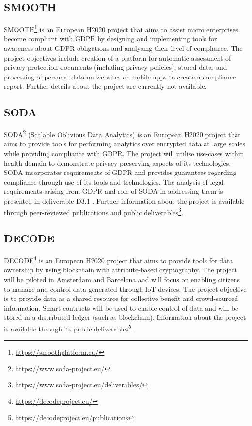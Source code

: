\subsection*{SMOOTH}
SMOOTH\footnote{\url{https://smoothplatform.eu/}} is an European H2020 project that aims to assist micro enterprises become compliant with GDPR by designing and implementing tools for awareness about GDPR obligations and analysing their level of compliance.
The project objectives include creation of a platform for automatic assessment of privacy protection documents (including privacy policies), stored data, and processing of personal data on websites or mobile apps to create a compliance report. Further details about the project are currently not available.

\subsection*{SODA}
SODA\footnote{\url{https://www.soda-project.eu/}} (Scalable Oblivious Data Analytics) is an European H2020 project that aims to provide tools for performing analytics over encrypted data at large scales while providing compliance with GDPR. The project will utilise use-cases within health domain to demonstrate privacy-preserving aspects of its technologies. SODA incorporates requirements of GDPR and provides guarantees regarding compliance through use of its tools and technologies. The analysis of legal requirements arising from GDPR and role of SODA in addressing them is presented in deliverable D3.1 \cite{spindler_d3.1_2017}. Further information about the project is available through peer-reviewed publications and public deliverables\footnote{\url{https://www.soda-project.eu/deliverables/}}.

\subsection*{DECODE}
DECODE\footnote{\url{https://decodeproject.eu/}} is an European H2020 project that aims to provide tools for data ownership by using blockchain with attribute-based cryptography. The project will be piloted in Amsterdam and Barcelona and will focus on enabling citizens to manage and control data generated through IoT devices. The project objective is to provide data as a shared resource for collective benefit and crowd-sourced information. Smart contracts will be used to enable control of data and will be stored in a distributed ledger (such as blockchain). Information about the project is available through its public deliverables\footnote{\url{https://decodeproject.eu/publications}}.

